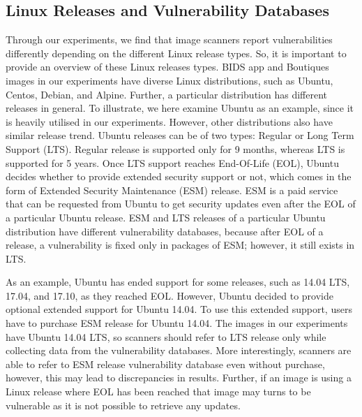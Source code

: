 \documentclass[a4paper,num-refs]{oup-contemporary}
\begin{document}
\subsection{Linux Releases and Vulnerability Databases}

Through our experiments, we find that image scanners report vulnerabilities 
differently depending on the different Linux release types. So, it is 
important to provide an overview of these Linux releases types. 
BIDS app and Boutiques images in our experiments have diverse Linux
distributions, such as Ubuntu, Centos, Debian, and Alpine. Further, a particular
distribution has different releases in general. To illustrate, we here examine Ubuntu as an example,
since it is heavily utilised in our experiments. However, other distributions also have
similar release trend. Ubuntu releases
can be of two types: Regular or Long Term Support (LTS).
Regular release is supported only for 9 months, whereas LTS is supported for 5 years. Once LTS support
reaches End-Of-Life (EOL), Ubuntu decides whether to provide extended security support or not, which comes
in the form of Extended Security Maintenance (ESM) release.
ESM is a paid service that can be requested from Ubuntu to get security 
updates even after the EOL of a particular Ubuntu release. ESM and LTS releases of a particular Ubuntu distribution have different vulnerability
databases, because after EOL of a release, a vulnerability is fixed only in packages of ESM; however, it still
exists in LTS.

As an example, Ubuntu has ended support for some releases, such as 14.04 LTS,
17.04, and 17.10, as they reached EOL. However, Ubuntu decided to provide optional extended support for Ubuntu 14.04.
To use this extended support, users have to purchase ESM release for Ubuntu 14.04.
The images in our experiments have Ubuntu 14.04 LTS, so scanners should refer
to LTS release only while collecting data from the vulnerability databases.
More interestingly, scanners are able to refer to ESM release vulnerability database
even without purchase, however, this may lead to discrepancies in results.
Further, if an image is using a Linux release where EOL has been reached that image may
turns to be vulnerable as it is not possible to retrieve any updates.
\end{document}
